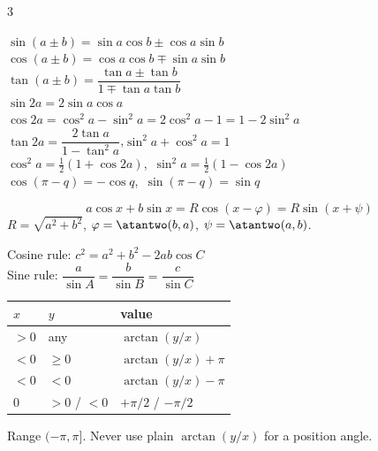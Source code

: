 \begin{multicols}{3}
\begin{fbx}[Identities]
$\sin(a\pm b)=\sin a\cos b\pm\cos a\sin b$\\
$\cos(a\pm b)=\cos a\cos b\mp\sin a\sin b$\\
$\tan(a\pm b)=\dfrac{\tan a\pm\tan b}{1\mp\tan a\tan b}$\\
$\sin2a=2\sin a\cos a$\\
$\cos2a=\cos^2a-\sin^2a=2\cos^2a-1=1-2\sin^2a$\\
$\tan2a=\dfrac{2\tan a}{1-\tan^2a}$,\quad $\sin^2a+\cos^2a=1$\\
$\cos^2a=\tfrac12(1+\cos2a)$,\ $\sin^2a=\tfrac12(1-\cos2a)$\\
$\cos(\pi-q)=-\cos q$,\ $\sin(\pi-q)=\sin q$
\end{fbx}
\begin{fbx}
\[a\cos x+b\sin x=R\cos(x-\varphi)=R\sin(x+\psi)\]
$R=\sqrt{a^2+b^2}$, $\varphi=\atantwo(b,a)$, $\psi=\atantwo(a,b)$.
\end{fbx}
\begin{fbx}
Cosine rule: $c^2=a^2+b^2-2ab\cos C$\\
Sine rule: $\dfrac a{\sin A}=\dfrac b{\sin B}=\dfrac c{\sin C}$
\end{fbx}
\begin{fbx}
\begin{tabularx}{\linewidth}{@{}lXl@{}}\toprule
$x$ & $y$ & value\\\midrule
$>0$ & any & $\arctan(y/x)$\\
$<0$ & $\ge0$ & $\arctan(y/x)+\pi$\\
$<0$ & $<0$ & $\arctan(y/x)-\pi$\\
$0$ & $>0$ / $<0$ & $+\pi/2$ / $-\pi/2$\\\bottomrule
\end{tabularx}
Range $(-\pi,\pi]$. Never use plain $\arctan(y/x)$ for a position angle.
\end{fbx}


\end{multicols}

